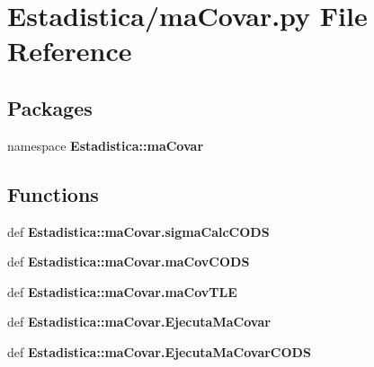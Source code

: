 \section{\-Estadistica/ma\-Covar.py \-File \-Reference}
\label{ma_covar_8py}
\subsection*{\-Packages}
\begin{DoxyCompactItemize}
\item 
namespace {\bf \-Estadistica\-::ma\-Covar}
\end{DoxyCompactItemize}
\subsection*{\-Functions}
\begin{DoxyCompactItemize}
\item 
def {\bf \-Estadistica\-::ma\-Covar.\-sigma\-Calc\-C\-O\-D\-S}
\item 
def {\bf \-Estadistica\-::ma\-Covar.\-ma\-Cov\-C\-O\-D\-S}
\item 
def {\bf \-Estadistica\-::ma\-Covar.\-ma\-Cov\-T\-L\-E}
\item 
def {\bf \-Estadistica\-::ma\-Covar.\-Ejecuta\-Ma\-Covar}
\item 
def {\bf \-Estadistica\-::ma\-Covar.\-Ejecuta\-Ma\-Covar\-C\-O\-D\-S}
\end{DoxyCompactItemize}
